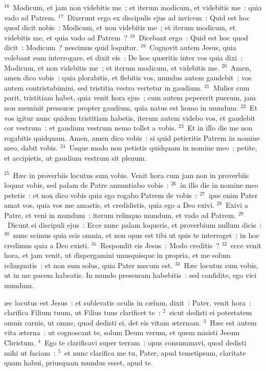 ${}^{16}$~Modicum, et jam non videbitis me~; et iterum modicum, et videbitis me~: quia vado ad Patrem.
${}^{17}$~Dixerunt ergo ex discipulis ejus ad invicem~: Quid est hoc quod dicit nobis~: Modicum, et non videbitis me~; et iterum modicum, et videbitis me, et quia vado ad Patrem~?
${}^{18}$~Dicebant ergo~: Quid est hoc quod dicit~: Modicum~? nescimus quid loquitur.
${}^{19}$~Cognovit autem Jesus, quia volebant eum interrogare, et dixit eis~: De hoc qu\ae ritis inter vos quia dixi~: Modicum, et non videbitis me~; et iterum modicum, et videbitis me.
${}^{20}$~Amen, amen dico vobis~: quia plorabitis, et flebitis vos, mundus autem gaudebit~; vos autem contristabimini, sed tristitia vestra vertetur in gaudium.
${}^{21}$~Mulier cum parit, tristitiam habet, quia venit hora ejus~; cum autem pepererit puerum, jam non meminit pressur\ae\ propter gaudium, quia natus est homo in mundum.
${}^{22}$~Et vos igitur nunc quidem tristitiam habetis, iterum autem videbo vos, et gaudebit cor vestrum~: et gaudium vestrum nemo tollet a vobis.
${}^{23}$~Et in illo die me non rogabitis quidquam. Amen, amen dico vobis~: si quid petieritis Patrem in nomine meo, dabit vobis.
${}^{24}$~Usque modo non petistis quidquam in nomine meo~: petite, et accipietis, ut gaudium vestrum sit plenum.


${}^{25}$~H\ae c in proverbiis locutus sum vobis. Venit hora cum jam non in proverbiis loquar vobis, sed palam de Patre annuntiabo vobis~:
${}^{26}$~in illo die in nomine meo petetis~: et non dico vobis quia ego rogabo Patrem de vobis~:
${}^{27}$~ipse enim Pater amat vos, quia vos me amastis, et credidistis, quia ego a Deo exivi.
${}^{28}$~Exivi a Patre, et veni in mundum~: iterum relinquo mundum, et vado ad Patrem.
${}^{29}$~Dicunt ei discipuli ejus~: Ecce nunc palam loqueris, et proverbium nullum dicis~:
${}^{30}$~nunc scimus quia scis omnia, et non opus est tibi ut quis te interroget~: in hoc credimus quia a Deo existi.
${}^{31}$~Respondit eis Jesus~: Modo creditis~?
${}^{32}$~ecce venit hora, et jam venit, ut dispergamini unusquisque in propria, et me solum relinquatis~: et non sum solus, quia Pater mecum est.
${}^{33}$~H\ae c locutus sum vobis, ut in me pacem habeatis. In mundo pressuram habebitis~: sed confidite, ego vici mundum.

\bchapter
{}\ae c locutus est Jesus~: et sublevatis oculis in c\ae lum, dixit~: Pater, venit hora~: clarifica Filium tuum, ut Filius tuus clarificet te~:
${}^{2}$~sicut dedisti ei potestatem omnis carnis, ut omne, quod dedisti ei, det eis vitam \ae ternam.
${}^{3}$~H\ae c est autem vita \ae terna~: ut cognoscant te, solum Deum verum, et quem misisti Jesum Christum.
${}^{4}$~Ego te clarificavi super terram~: opus consummavi, quod dedisti mihi ut faciam~:
${}^{5}$~et nunc clarifica me tu, Pater, apud temetipsum, claritate quam habui, priusquam mundus esset, apud te.


